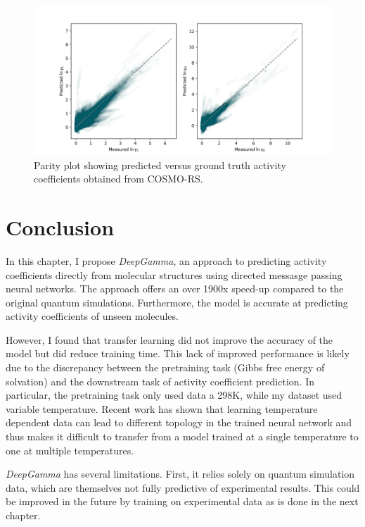 \begin{figure}[t]
    \centering
    \includegraphics[width=\textwidth]{gfx/Chapter07/cosmo_base_test_indp_parity_plot.png}
    \caption{Parity plot showing predicted versus ground truth activity coefficients obtained from COSMO-RS.}
    \label{fig:my_label}
\end{figure}


\section{Conclusion}

In this chapter, I propose \textit{DeepGamma}, an approach to predicting activity coefficients directly from molecular structures using directed messasge passing neural networks. The approach offers an over 1900x speed-up compared to the original quantum simulations.  Furthermore, the model is accurate at predicting activity coefficients of unseen molecules.

However, I found that transfer learning did not improve the accuracy of the model but did reduce training time. This lack of improved performance is likely due to the discrepancy between the pretraining task (Gibbs free energy of solvation) and the downstream task of activity coefficient prediction. In particular, the pretraining task only used data a 298K, while my dataset used variable temperature. Recent work \cite{Lansford2023} has shown that learning temperature dependent data can lead to different topology in the trained neural network and thus makes it difficult to transfer from a model trained at a single temperature to one at multiple temperatures.

\textit{DeepGamma} has several limitations. First,  it relies solely on quantum simulation data, which are themselves not fully predictive of experimental results. This could be improved in the future by training on experimental data as is done in the next chapter.

